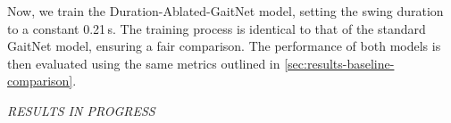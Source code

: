 Now, we train the Duration-Ablated-GaitNet model, setting the swing
duration to a constant 0.21\,s. The training process is identical to
that of the standard GaitNet model, ensuring a fair comparison. The
performance of both models is then evaluated using the same metrics outlined in
\autoref{sec:results-baseline-comparison}.

\textit{RESULTS IN PROGRESS}


